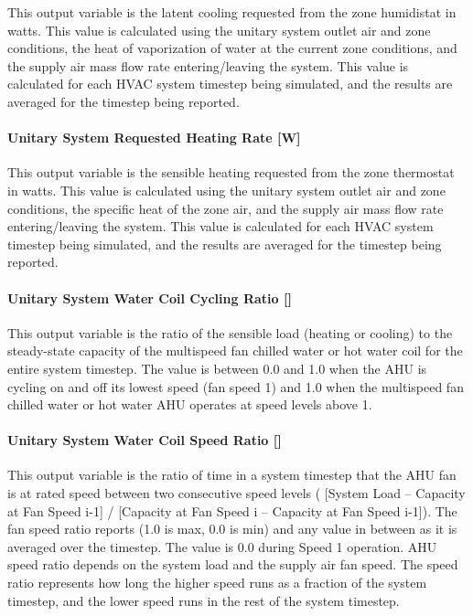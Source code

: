 This output variable is the latent cooling requested from the zone humidistat in watts. This value is calculated using the unitary system outlet air and zone conditions, the heat of vaporization of water at the current zone conditions, and the supply air mass flow rate entering/leaving the system. This value is calculated for each HVAC system timestep being simulated, and the results are averaged for the timestep being reported.

\paragraph{Unitary System Requested Heating Rate {[}W{]}}\label{unitary-system-requested-heating-rate-w}

This output variable is the sensible heating requested from the zone thermostat in watts. This value is calculated using the unitary system outlet air and zone conditions, the specific heat of the zone air, and the supply air mass flow rate entering/leaving the system. This value is calculated for each HVAC system timestep being simulated, and the results are averaged for the timestep being reported.

\paragraph{Unitary System Water Coil Cycling Ratio {[]}}\label{unitary-system-water-coil-cycling-ratio}

This output variable is the ratio of the sensible load (heating or cooling) to the steady-state capacity of the multispeed fan chilled water or hot water coil for the entire system timestep. The value is between 0.0 and 1.0 when the AHU is cycling on and off its lowest speed (fan speed 1) and 1.0 when the multispeed fan chilled water or hot water AHU operates at speed levels above 1.

\paragraph{Unitary System Water Coil Speed Ratio {[]}}\label{unitary-system-water-coil-speed-ratio}

This output variable is the ratio of time in a system timestep that the AHU fan is at rated speed between two consecutive speed levels ( {[}System Load -- Capacity at Fan Speed i-1{]} / {[}Capacity at Fan Speed i -- Capacity at Fan Speed i-1{]}). The fan speed ratio reports (1.0 is max, 0.0 is min) and any value in between as it is averaged over the timestep. The value is 0.0 during Speed 1 operation. AHU speed ratio depends on the system load and the supply air fan speed. The speed ratio represents how long the higher speed runs as a fraction of the system timestep, and the lower speed runs in the rest of the system timestep.

